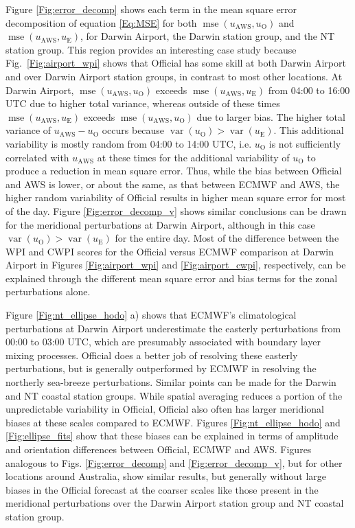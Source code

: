 \documentclass{ametsoc}
\DeclareMathOperator{\mse}{mse}
\DeclareMathOperator{\var}{var}
\begin{document}
Figure \ref{Fig:error_decomp} shows each term in the mean square error decomposition of equation \ref{Eq:MSE} for both $\mse\left(u_\text{AWS}, u_\text{O}\right)$ and $\mse\left(u_\text{AWS}, u_\text{E}\right)$, for Darwin Airport, the Darwin station group, and the NT station group. This region provides an interesting case study because Fig.~\ref{Fig:airport_wpi} shows that Official has some skill at both Darwin Airport and over Darwin Airport station groups, in contrast to most other locations. At Darwin Airport, $\mse\left(u_\text{AWS}, u_\text{O}\right)$ exceeds $\mse\left(u_\text{AWS}, u_\text{E}\right)$ from 04:00 to 16:00 UTC due to higher total variance, whereas outside of these times $\mse\left(u_\text{AWS}, u_\text{E}\right)$ exceeds $\mse\left(u_\text{AWS}, u_\text{O}\right)$ due to larger bias. The higher total variance of $u_\text{AWS} - u_\text{O}$ occurs because $\var\left(u_\text{O}\right) > \var\left(u_\text{E}\right)$. This additional variability is mostly random from 04:00 to 14:00 UTC, i.e. $u_\text{O}$ is not sufficiently correlated with $u_\text{AWS}$ at these times for the additional variability of $u_\text{O}$ to produce a reduction in mean square error. Thus, while the bias between Official and AWS is lower, or about the same, as that between ECMWF and AWS, the higher random variability of Official results in higher mean square error for most of the day. Figure \ref{Fig:error_decomp_v} shows similar conclusions can be drawn for the meridional perturbations at Darwin Airport, although in this case $\var\left(u_\text{O}\right) > \var\left(u_\text{E}\right)$ for the entire day. Most of the difference between the WPI and CWPI scores for the Official versus ECMWF comparison at Darwin Airport in Figures \ref{Fig:airport_wpi} and \ref{Fig:airport_cwpi}, respectively, can be explained through the different mean square error and bias terms for the zonal perturbations alone. 

Figure \ref{Fig:nt_ellipse_hodo} a) shows that ECMWF's climatological perturbations at Darwin Airport underestimate the easterly perturbations from 00:00 to 03:00 UTC, which are presumably associated with boundary layer mixing processes. Official does a better job of resolving these easterly perturbations, but is generally outperformed by ECMWF in resolving the northerly sea-breeze perturbations. Similar points can be made for the Darwin and NT coastal station groups. While spatial averaging reduces a portion of the unpredictable variability in Official, Official also often has larger meridional biases at these scales compared to ECMWF. Figures \ref{Fig:nt_ellipse_hodo} and \ref{Fig:ellipse_fits} show that these biases can be explained in terms of amplitude and orientation differences between Official, ECMWF and AWS. Figures analogous to Figs. \ref{Fig:error_decomp} and \ref{Fig:error_decomp_v}, but for other locations around Australia, show similar results, but generally without large biases in the Official forecast at the coarser scales like those present in the meridional perturbations over the Darwin Airport station group and NT coastal station group.   
\end{document}
